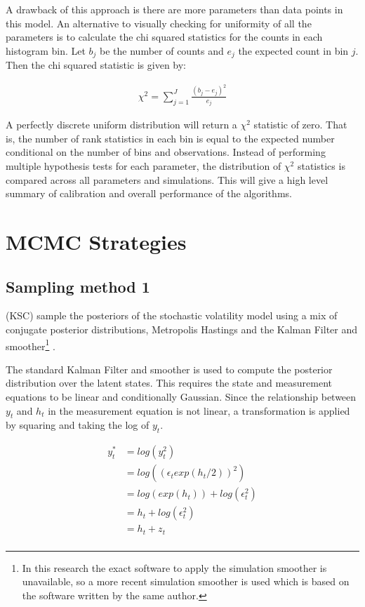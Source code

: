 \documentclass[12pt, a4paper]{article}
\begin{document}
            A drawback of this approach is there are more parameters than data points in this model. An alternative to visually checking for uniformity of all the parameters is to calculate the chi squared statistics for the counts in each histogram bin. Let $b_j$ be the number of counts and $e_j$ the expected count in bin $j$. Then the chi squared statistic is given by:
            
            $$
            \begin{aligned}
            \chi^2 = \sum_{j=1}^J \frac{(b_{j} - e_{j})^2}{e_j}
            \end{aligned}
            $$
            
            A perfectly discrete uniform distribution will return a $\chi^2$ statistic of zero. That is, the number of rank statistics in each bin is equal to the expected number conditional on the number of bins and observations. Instead of performing multiple hypothesis tests for each parameter, the distribution of $\chi^2$ statistics is compared across all parameters and simulations. This will give a high level summary of calibration and overall performance of the algorithms.        

\section{MCMC Strategies}

    \subsection{Sampling method 1}
        (KSC) sample the posteriors of the stochastic volatility model using a mix of conjugate posterior distributions, Metropolis Hastings and the Kalman Filter and smoother\footnote{In this research the exact software to apply the simulation smoother is unavailable, so a more recent simulation smoother is used which is based on the software written by the same author.} \citep{dejong1995}.

        The standard Kalman Filter and smoother is used to compute the posterior distribution over the latent states. This requires the state and measurement equations to be linear and conditionally Gaussian. Since the relationship between $y_t$ and $h_t$ in the measurement equation is not linear, a transformation is applied by squaring and taking the log of $y_t$.

        $$
        \begin{aligned}
        y_t^{*} &= log(y_t^2) \\ 
        &= log((\epsilon_t exp(h_t/2))^2) \\
        &=  log(exp(h_t)) + log(\epsilon_t^2) \\
        &= h_t + log(\epsilon_t^2)  \\
        &= h_t + z_t \\
        \end{aligned}
        $$
\end{document}
